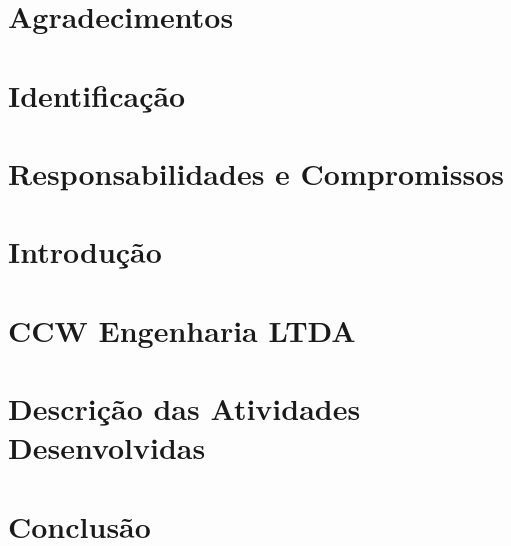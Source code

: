 \documentclass[
	12pt,				%
	openright,			%
	twoside,			%
	a4paper,			%
	english,			%
	french,				%
	spanish,			%
	brazil,				%
	]{abntex2}
\begin{document}

\frenchspacing 


\imprimircapa

\imprimirfolhaderosto*


\chapter{Agradecimentos}



\chapter{Identificação}



\chapter{Responsabilidades e Compromissos}


\chapter{Introdução}


\chapter{CCW Engenharia LTDA}


\chapter{Descrição das Atividades Desenvolvidas}



\chapter{Conclusão}

\end{document}
